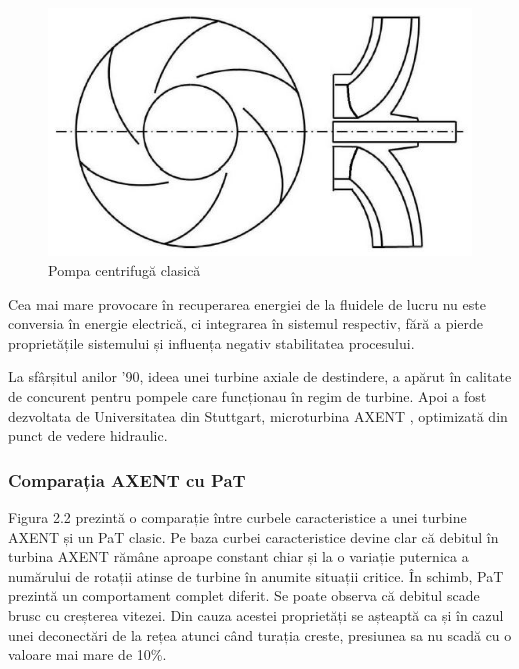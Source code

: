 \begin{figure}[h!]
	\centering
	\includegraphics[scale=0.7]{figures/centrifugal-pump.jpg}
	\caption{Pompa centrifugă clasică \protect\cite{neipp2017zweistufige}}
	\label{Pompa centrifugă clasică \u{a}}
\end{figure}

Cea mai mare provocare în recuperarea energiei de la fluidele de lucru nu este conversia în energie electrică, ci integrarea în sistemul respectiv, fără a pierde proprietățile sistemului și
influența negativ stabilitatea procesului.

La sfârșitul anilor '90, ideea unei turbine axiale de destindere, a apărut în calitate de concurent pentru pompele care funcționau în regim de turbine. Apoi a fost dezvoltata de Universitatea din Stuttgart, microturbina AXENT \cite{gentner2000experimentelle}, optimizată din punct de vedere hidraulic.


\subsubsection{Comparația AXENT cu PaT}

Figura 2.2 prezintă o comparație între curbele caracteristice a unei turbine AXENT și un PaT clasic. Pe baza curbei caracteristice devine clar că debitul în turbina AXENT rămâne aproape constant chiar și la o variație puternica a numărului de rotații atinse de turbine în anumite situații critice. În schimb, PaT prezintă un comportament complet diferit. Se poate observa că debitul scade brusc cu creșterea vitezei. Din cauza acestei proprietăți se așteaptă ca și în cazul unei deconectări de la rețea atunci când turația creste, presiunea sa nu scadă cu o valoare mai mare de 10\%.


